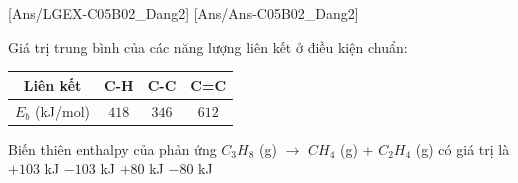 \documentclass[Main.tex]{subfiles}
\begin{document}

[Ans/LGEX-C05B02_Dang2]
[Ans/Ans-C05B02_Dang2]
\begin{ex} Giá trị trung bình của các năng lượng liên kết ở điều kiện chuẩn:
	\begin{center}
		\begin{tabular}{|c|c|c|c|}
			\hline
			Liên kết & C-H & C-C & C=C \\
			\hline
			$E_b$ (kJ/mol) & $418$ & $346$ & $612$ \\
			\hline
		\end{tabular}
	\end{center}
	Biến thiên enthalpy của phản ứng $C_3H_8$ (g) $\longrightarrow$ $CH_4$ (g) + $C_2H_4$ (g) có giá trị là
	\choice
	{$+103$ kJ}
	{$-103$ kJ}
	{\True $+80$ kJ}
	{$-80$ kJ}
\end{ex}
\end{document}
